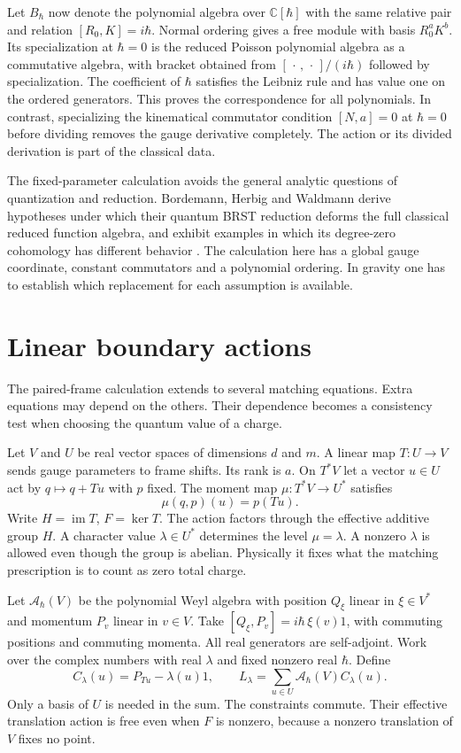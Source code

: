 \documentclass[11pt,letterpaper]{article}
\newcommand{\cA}{\mathcal A}
\newcommand{\CC}{\mathbb C}
\begin{document}
Let $B_\hbar$ now denote the polynomial algebra over $\CC[\hbar]$ with the same relative pair
and relation $[R_0,K]=i\hbar$. Normal ordering gives a free module with basis $R_0^aK^b$. Its
specialization at $\hbar=0$ is the reduced Poisson polynomial algebra as a commutative
algebra, with bracket obtained from $[\,\cdot\,,\,\cdot\,]/(i\hbar)$ followed by
specialization. The coefficient of $\hbar$ satisfies the Leibniz rule and has value one on the
ordered generators. This proves the correspondence for all polynomials. In contrast,
specializing the kinematical commutator condition $[N,a]=0$ at $\hbar=0$ before dividing
removes the gauge derivative completely. The action or its divided derivation is part of the
classical data.

The fixed-parameter calculation avoids the general analytic questions of quantization and
reduction. Bordemann, Herbig and Waldmann derive hypotheses under which their quantum BRST
reduction deforms the full classical reduced function algebra, and exhibit examples in which
its degree-zero cohomology has different behavior \cite{brst}. The calculation here has a
global gauge coordinate, constant commutators and a polynomial ordering. In gravity one has to
establish which replacement for each assumption is available.

\section{Linear boundary actions}
\label{sec:linear}
The paired-frame calculation extends to several matching equations. Extra equations may depend
on the others. Their dependence becomes a consistency test when choosing the quantum value of
a charge.

Let $V$ and $U$ be real vector spaces of dimensions $d$ and $m$. A linear map $T:U\to V$ sends
gauge parameters to frame shifts. Its rank is $a$. On $T^*V$ let a vector $u\in U$ act by
$q\mapsto q+Tu$ with $p$ fixed. The moment map $\mu:T^*V\to U^*$ satisfies
\[
 \mu(q,p)(u)=p(Tu).
\]
Write $H=\operatorname{im}T$, $F=\ker T$. The action factors through the effective additive
group $H$. A character value $\lambda\in U^*$ determines the level $\mu=\lambda$. A nonzero
$\lambda$ is allowed even though the group is abelian. Physically it fixes what the matching
prescription is to count as zero total charge.

Let $\cA_\hbar(V)$ be the polynomial Weyl algebra with position $Q_\xi$ linear in $\xi\in V^*$
and momentum $P_v$ linear in $v\in V$. Take $[Q_\xi,P_v]=i\hbar\,\xi(v)1$, with commuting
positions and commuting momenta. All real generators are self-adjoint. Work over the complex
numbers with real $\lambda$ and fixed nonzero real $\hbar$. Define
\[
 C_\lambda(u)=P_{Tu}-\lambda(u)1,\qquad
 L_\lambda=\sum_{u\in U}\cA_\hbar(V) C_\lambda(u).
\]
Only a basis of $U$ is needed in the sum. The constraints commute. Their effective translation
action is free even when $F$ is nonzero, because a nonzero translation of $V$ fixes no point.
\end{document}
